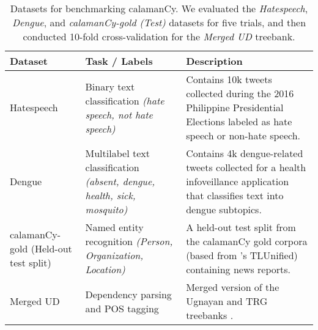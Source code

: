 \documentclass[../emnlp2023.tex]{subfiles}
\begin{document}
\begin{table*}[t]
\begin{tabular}{@{}p{4cm}p{4cm}p{7.25cm}@{}}
\toprule
Dataset &  Task / Labels & Description  \\ \midrule
Hatespeech \citep{Cabasag2016HatespeechIP} & Binary text classification \textit{(hate speech, not hate speech)} & Contains 10k tweets collected during the 2016 Philippine Presidential Elections labeled as hate speech or non-hate speech. \\
Dengue \citep{Livelo2018IntelligentDI}  & Multilabel text classification \textit{(absent, dengue, health, sick, mosquito)}   & Contains 4k dengue-related tweets collected for a health infoveillance application that classifies text into dengue subtopics.\\
calamanCy-gold (Held-out test split) & Named entity recognition \textit{(Person, Organization, Location)} & A held-out test split from the calamanCy gold corpora (based from \citealp{Cruz2021ImprovingLL}'s TLUnified) containing news reports. \\ 
Merged UD & Dependency parsing and POS tagging & Merged version of the Ugnayan and TRG treebanks \citep{Aquino2020ParsingIT,Samson2018TRG}. \\ \bottomrule
\end{tabular}
\caption{
    Datasets for benchmarking calamanCy. 
    We evaluated the \textit{Hatespeech}, \textit{Dengue}, and \textit{calamanCy-gold (Test)} datasets for five trials, and then conducted 10-fold cross-validation for the \textit{Merged UD} treebank.
}
\label{table:benchmark_datasets}
\end{table*}
\end{document}
